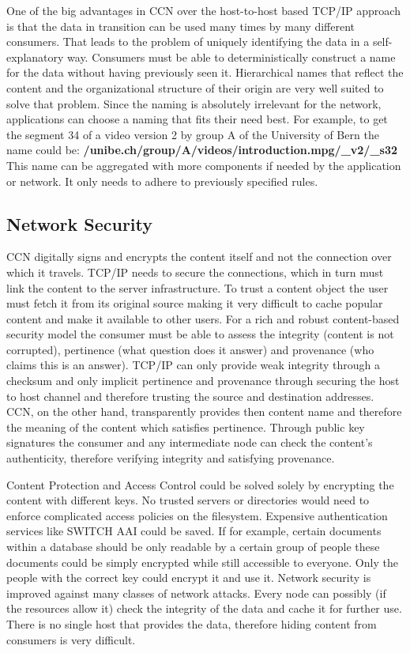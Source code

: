 One of the big advantages in CCN over the host-to-host based TCP/IP approach is that the data in transition can be used many times by many different consumers. That leads to the problem of uniquely identifying the data in a self-explanatory way. Consumers must be able to deterministically construct a name for the data without having previously seen it. Hierarchical names that reflect the content and the organizational structure of their origin are very well suited to solve that problem. Since the naming is absolutely irrelevant for the network, applications can choose a naming that fits their need best. For example, to get the segment 34 of a video version 2 by group A of the University of Bern the name could be: \textbf{/unibe.ch/group/A/videos/introduction.mpg/\_v2/\_s32}\\
This name can be aggregated with more components if needed by the application or network. It only needs to adhere to previously specified rules.


\subsection{Network Security}

CCN digitally signs and encrypts the content itself and not the connection over which it travels. TCP/IP needs to secure the connections, which in turn must link the content to the server infrastructure. To trust a content object the user must fetch it from its original source making it very difficult to cache popular content and make it available to other users. For a rich and robust content-based security model the consumer must be able to assess the integrity (content is not corrupted), pertinence (what question does it answer) and provenance (who claims this is an answer). TCP/IP can only provide weak integrity through a checksum and only implicit pertinence and provenance through securing the host to host channel and therefore trusting the source and destination addresses. CCN, on the other hand, transparently provides then content name and therefore the meaning of the content which satisfies pertinence. Through public key signatures the consumer and any intermediate node can check the content's authenticity, therefore verifying integrity and satisfying provenance.

\vspace{5mm} %

Content Protection and Access Control could be solved solely by encrypting the content with different keys. No trusted servers or directories would need to enforce complicated access policies on the filesystem. Expensive authentication services like SWITCH AAI could be saved. If for example, certain documents within a database should be only readable by a certain group of people these documents could be simply encrypted while still accessible to everyone. Only the people with the correct key could encrypt it and use it.
Network security is improved against many classes of network attacks. Every node can possibly (if the resources allow it) check the integrity of the data and cache it for further use. There is no single host that provides the data, therefore hiding content from consumers is very difficult.

